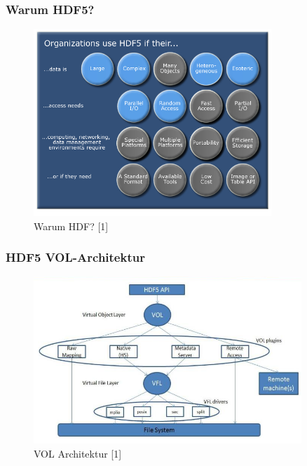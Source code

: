 \begin{frame}
	\frametitle{Warum HDF5?}
	\begin{figure}
		\centering
		\includegraphics[width=0.8\textwidth]{pictures/why.jpg}
		\caption*{Warum HDF? [1]}
	\end{figure}
\end{frame}


\begin{frame}
	\frametitle{HDF5 VOL-Architektur}
	\begin{figure}
		\centering
		\includegraphics[width=0.9\textwidth]{pictures/vol.png}
		\caption*{VOL Architektur [1]}
	\end{figure}
\end{frame}




